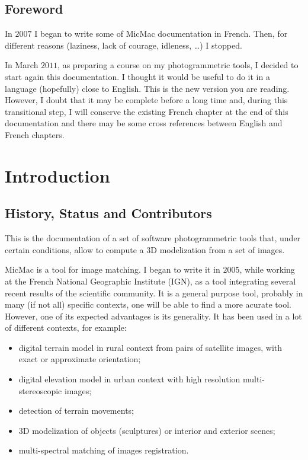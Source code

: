 \section{Foreword}
In $2007$ I began to write some of MicMac documentation in French. Then,
for different reasons (laziness, lack of courage, idleness, \dots) I stopped.

In March $2011$, as preparing a course on my photogrammetric tools, I decided
to start again this documentation. I thought it would be useful to
do it in a language (hopefully) close to English.  This is the new
version you are reading. However, I doubt that it may be complete before a long time and,
during this transitional step, I will conserve the existing French chapter at the end
of this documentation and there may be some cross references between English and French chapters.



\chapter{Introduction}


\section{History, Status and Contributors}

This is the documentation of a set of software
photogrammetric tools that, under certain
conditions, allow to compute a 3D modelization from a
set of images.

MicMac is a tool for image matching. I began to write it in $2005$, while working at the
French National Geographic Institute (IGN), as
a tool integrating several recent results of the scientific community.
It is a general purpose tool, probably in many (if not all) specific
contexts, one will be able to find a more acurate tool. However, one
of its expected advantages is its generality. It has been used
in a lot of different contexts, for example:

\begin{itemize}
   \item digital terrain model in rural context from pairs of satellite
         images, with exact or approximate orientation;

   \item digital elevation model in urban context with high resolution
         multi-stereoscopic images;

   \item detection of terrain movements;

   \item 3D modelization of objects (sculptures) or interior and exterior scenes;

   \item multi-spectral matching of images registration.

\end{itemize}

